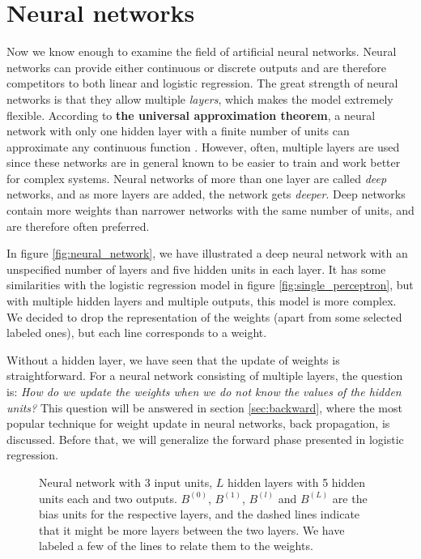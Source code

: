 \section{Neural networks} \label{sec:neural_network}
Now we know enough to examine the field of artificial neural networks. Neural networks can provide either continuous or discrete outputs and are therefore competitors to both linear and logistic regression. The great strength of neural networks is that they allow multiple \textit{layers}, which makes the model extremely flexible. According to \textbf{the universal approximation theorem}, a neural network with only one hidden layer with a finite number of units can approximate any continuous function \supercite{hornik_multilayer_1989}. However, often, multiple layers are used since these networks are in general known to be easier to train and work better for complex systems. Neural networks of more than one layer are called \textit{deep} networks, and as more layers are added, the network gets \textit{deeper}. Deep networks contain more weights than narrower networks with the same number of units, and are therefore often preferred.

In figure \eqref{fig:neural_network}, we have illustrated a deep neural network with an unspecified number of layers and five hidden units in each layer. It has some similarities with the logistic regression model in figure \eqref{fig:single_perceptron}, but with multiple hidden layers and multiple outputs, this model is more complex. We decided to drop the representation of the weights (apart from some selected labeled ones), but each line corresponds to a weight.

Without a hidden layer, we have seen that the update of weights is straightforward. For a neural network consisting of multiple layers, the question is: \textit{How do we update the weights when we do not know the values of the hidden units?} This question will be answered in section \ref{sec:backward}, where the most popular technique for weight update in neural networks, back propagation, is discussed. Before that, we will generalize the forward phase presented in logistic regression.

\begin{figure}
	\centering
	
	\caption{Neural network with 3 input units, $L$ hidden layers with 5 hidden units each and two outputs. $B^{(0)}$, $B^{(1)}$, $B^{(l)}$ and $B^{(L)}$ are the bias units for the respective layers, and the dashed lines indicate that it might be more layers between the two layers. We have labeled a few of the lines to relate them to the weights.}
	\label{fig:neural_network}
\end{figure}

